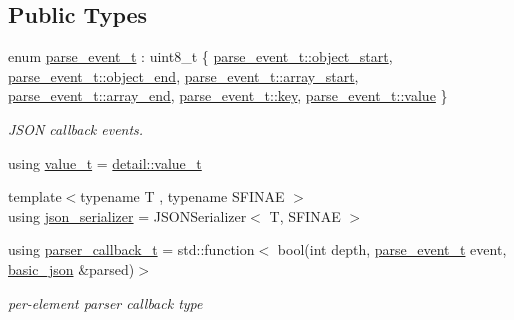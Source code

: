 \subsection*{Public Types}
\begin{DoxyCompactItemize}
\item 
enum \mbox{\hyperlink{classnlohmann_1_1basic__json_aea1c863b719b4ca5b77188c171bbfafe}{parse\+\_\+event\+\_\+t}} \+: uint8\+\_\+t \{ \newline
\mbox{\hyperlink{classnlohmann_1_1basic__json_aea1c863b719b4ca5b77188c171bbfafeae73f17027cb0acbb537f29d0a6944b26}{parse\+\_\+event\+\_\+t\+::object\+\_\+start}}, 
\mbox{\hyperlink{classnlohmann_1_1basic__json_aea1c863b719b4ca5b77188c171bbfafeaf63e2a2468a37aa4f394fcc3bcb8249c}{parse\+\_\+event\+\_\+t\+::object\+\_\+end}}, 
\mbox{\hyperlink{classnlohmann_1_1basic__json_aea1c863b719b4ca5b77188c171bbfafeaa4388a3d92419edbb1c6efd4d52461f3}{parse\+\_\+event\+\_\+t\+::array\+\_\+start}}, 
\mbox{\hyperlink{classnlohmann_1_1basic__json_aea1c863b719b4ca5b77188c171bbfafea49642fb732aa2e112188fba1f9d3ef7f}{parse\+\_\+event\+\_\+t\+::array\+\_\+end}}, 
\newline
\mbox{\hyperlink{classnlohmann_1_1basic__json_aea1c863b719b4ca5b77188c171bbfafea3c6e0b8a9c15224a8228b9a98ca1531d}{parse\+\_\+event\+\_\+t\+::key}}, 
\mbox{\hyperlink{classnlohmann_1_1basic__json_aea1c863b719b4ca5b77188c171bbfafea2063c1608d6e0baf80249c42e2be5804}{parse\+\_\+event\+\_\+t\+::value}}
 \}
\begin{DoxyCompactList}\small\item\em J\+S\+ON callback events. \end{DoxyCompactList}\item 
using \mbox{\hyperlink{classnlohmann_1_1basic__json_ae8cbef097f7da18a781fc86587de6b90}{value\+\_\+t}} = \mbox{\hyperlink{namespacenlohmann_1_1detail_a90aa5ef615aa8305e9ea20d8a947980f}{detail\+::value\+\_\+t}}
\item 
{\footnotesize template$<$typename T , typename S\+F\+I\+N\+AE $>$ }\\using \mbox{\hyperlink{classnlohmann_1_1basic__json_a7768841baaaa7a21098a401c932efaff}{json\+\_\+serializer}} = J\+S\+O\+N\+Serializer$<$ T, S\+F\+I\+N\+AE $>$
\item 
using \mbox{\hyperlink{classnlohmann_1_1basic__json_aecae491e175f8767c550ae3c59e180e3}{parser\+\_\+callback\+\_\+t}} = std\+::function$<$ bool(int depth, \mbox{\hyperlink{classnlohmann_1_1basic__json_aea1c863b719b4ca5b77188c171bbfafe}{parse\+\_\+event\+\_\+t}} event, \mbox{\hyperlink{classnlohmann_1_1basic__json}{basic\+\_\+json}} \&parsed)$>$
\begin{DoxyCompactList}\small\item\em per-\/element parser callback type \end{DoxyCompactList}\end{DoxyCompactItemize}
